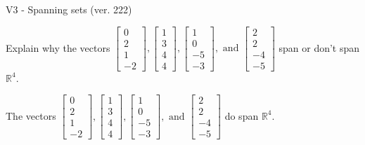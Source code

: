\begin{exercise}
  \begin{exerciseTitle}V3 - Spanning sets (ver. 222)\end{exerciseTitle}
  \begin{exerciseStatement}
    Explain why the vectors \(\left[\begin{array}{r}
0 \\
2 \\
1 \\
-2
\end{array}\right] , \left[\begin{array}{r}
1 \\
3 \\
4 \\
4
\end{array}\right] , \left[\begin{array}{r}
1 \\
0 \\
-5 \\
-3
\end{array}\right] , \text{ and } \left[\begin{array}{r}
2 \\
2 \\
-4 \\
-5
\end{array}\right]\) span or don't span \(\mathbb{R}^4\). 
	


  \end{exerciseStatement}
  \begin{exerciseAnswer}
   The vectors \(\left[\begin{array}{r}
0 \\
2 \\
1 \\
-2
\end{array}\right] , \left[\begin{array}{r}
1 \\
3 \\
4 \\
4
\end{array}\right] , \left[\begin{array}{r}
1 \\
0 \\
-5 \\
-3
\end{array}\right] , \text{ and } \left[\begin{array}{r}
2 \\
2 \\
-4 \\
-5
\end{array}\right]\) 
  	 do  
	span \(\mathbb{R}^4\).
  


  \end{exerciseAnswer}
\end{exercise}